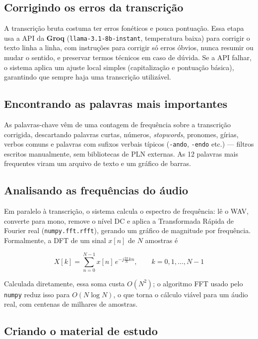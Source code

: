 \documentclass[11pt,a4paper]{article}
\begin{document}
\subsection{Corrigindo os erros da transcrição}

A transcrição bruta costuma ter erros fonéticos e pouca pontuação. Essa etapa usa a API da \textbf{Groq} (\texttt{llama-3.1-8b-instant}, temperatura baixa) para corrigir o texto linha a linha, com instruções para corrigir só erros óbvios, nunca resumir ou mudar o sentido, e preservar termos técnicos em caso de dúvida. Se a API falhar, o sistema aplica um ajuste local simples (capitalização e pontuação básica), garantindo que sempre haja uma transcrição utilizável.

\subsection{Encontrando as palavras mais importantes}

As palavras-chave vêm de uma contagem de frequência sobre a transcrição corrigida, descartando palavras curtas, números, \emph{stopwords}, pronomes, gírias, verbos comuns e palavras com sufixos verbais típicos (\texttt{-ando}, \texttt{-endo} etc.) --- filtros escritos manualmente, sem bibliotecas de PLN externas. As 12 palavras mais frequentes viram um arquivo de texto e um gráfico de barras.

\subsection{Analisando as frequências do áudio}

Em paralelo à transcrição, o sistema calcula o espectro de frequência: lê o WAV, converte para mono, remove o nível DC e aplica a Transformada Rápida de Fourier real (\texttt{numpy.fft.rfft}), gerando um gráfico de magnitude por frequência. Formalmente, a DFT de um sinal $x[n]$ de $N$ amostras é

\begin{equation}
X[k] = \sum_{n=0}^{N-1} x[n]\, e^{-j\frac{2\pi}{N}kn}, \qquad k = 0, 1, \ldots, N-1
\label{eq:dft}
\end{equation}

Calculada diretamente, essa soma custa $O(N^2)$; o algoritmo FFT usado pelo \texttt{numpy} reduz isso para $O(N \log N)$, o que torna o cálculo viável para um áudio real, com centenas de milhares de amostras.

\subsection{Criando o material de estudo}
\end{document}
